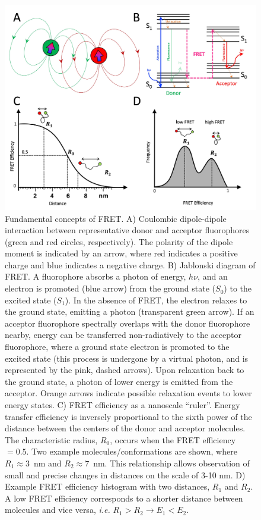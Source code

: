 \begin{figure}
    \centering
    \includegraphics[width=\textwidth]{chapters/figures/FRET_concept.jpg}
    \caption{\label{fig:FRET_concept} 
    Fundamental concepts of FRET.
    A) Coulombic dipole-dipole interaction between representative donor and acceptor fluorophores (green and red circles, respectively).
    The polarity of the dipole moment is indicated by an arrow, where red indicates a positive charge and blue indicates a negative charge. 
    B) Jablonski diagram of FRET. A fluorophore absorbs a photon of energy, $h\nu$, and an electron is promoted (blue arrow) from the ground state ($S_0$) to the excited state ($S_1$).
    In the absence of FRET, the electron relaxes to the ground state, emitting a photon (transparent green arrow). 
    If an acceptor fluorophore spectrally overlaps with the donor fluorophore nearby, energy can be transferred non-radiatively to the acceptor fluorophore, where a ground state electron is promoted to the excited state (this process is undergone by a virtual photon, and is represented by the pink, dashed arrows). 
    Upon relaxation back to the ground state, a photon of lower energy is emitted from the acceptor. 
    Orange arrows indicate possible relaxation events to lower energy states. 
    C) FRET efficiency as a nanoscale \enquote{ruler}. 
    Energy transfer efficiency is inversely proportional to the sixth power of the distance between the centers of the donor and acceptor molecules.
    The characteristic radius, $R_0$, occurs when the FRET efficiency $=0.5$.
    Two example molecules/conformations are shown, where $R_1 \approx 3$~nm and $R_2 \approx 7$~nm. 
    This relationship allows observation of small and precise changes in distances on the scale of 3-10 nm.
    D) Example FRET efficiency histogram with two distances, $R_1$ and $R_2$.
    A low FRET efficiency corresponds to a shorter distance between molecules and vice versa, \textit{i.e.} $R_1 > R_2 \rightarrow E_1 < E_2$.}
\end{figure}

